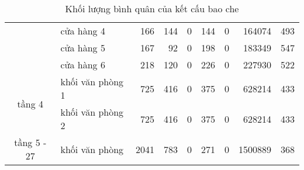 \begin{landscape}
\begin{table}[H]
\begin{adjustbox}{width=1.4\textheight}
\begin{tabular}{|c|l|r|r|r|r|r|r|r|}
		\cline{2-9}         & cửa hàng 4 & 166      & 144      & 0        & 144      & 0        & 164074   & 493 \bigstrut\\
		\cline{2-9}         & cửa hàng 5 & 167      & 92       & 0        & 198      & 0        & 183349   & 547 \bigstrut\\
		\cline{2-9}         & cửa hàng 6 & 218      & 120      & 0        & 226      & 0        & 227930   & 522 \bigstrut\\
		\hline
		\multirow{2}[4]{*}{tầng 4} & khối văn phòng 1 & 725      & 416      & 0        & 375      & 0        & 628214   & 433 \bigstrut\\
		\cline{2-9}         & khối văn phòng 2 & 725      & 416      & 0        & 375      & 0        & 628214   & 433 \bigstrut\\
		\hline
		tầng 5 - 27 & khối văn phòng & 2041     & 783      & 0        & 271      & 0        & 1500889  & 368 \bigstrut\\
		\hline
	\end{tabular}%
	\end{adjustbox}
	\caption{Khối lượng bình quân của kết cấu bao che}
	\label{b:klkcbc}%
\end{table}%
\end{landscape}

